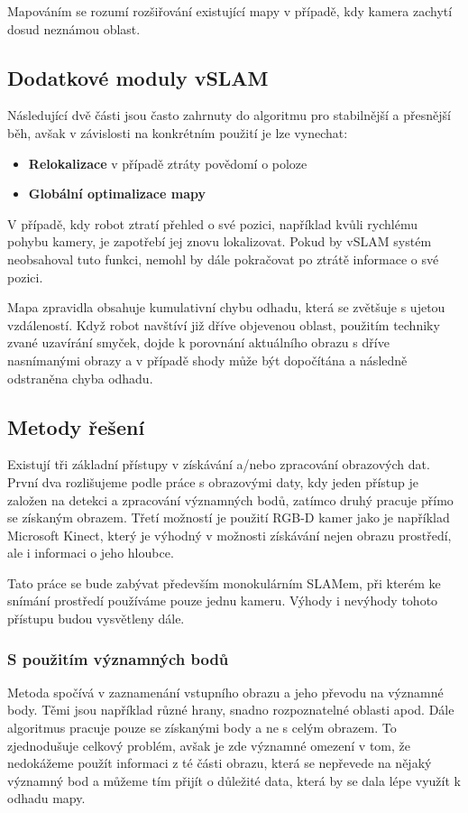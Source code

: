 \documentclass[12pt,a4paper]{article}
\begin{document}
Mapováním se rozumí rozšiřování existující mapy v případě, kdy kamera zachytí dosud neznámou oblast.

\subsection{Dodatkové moduly vSLAM}
Následující dvě části jsou často zahrnuty do algoritmu pro stabilnější a přesnější běh, avšak v závislosti na konkrétním použití je lze vynechat:
\begin{itemize}
\item \textbf{Relokalizace} v případě ztráty povědomí o poloze
\item \textbf{Globální optimalizace mapy}
\end{itemize}

V případě, kdy robot ztratí přehled o své pozici, například kvůli rychlému pohybu kamery, je zapotřebí jej znovu lokalizovat. Pokud by vSLAM systém neobsahoval tuto funkci, nemohl by dále pokračovat po ztrátě informace o své pozici.

Mapa zpravidla obsahuje kumulativní chybu odhadu, která se zvětšuje s ujetou \linebreak vzdáleností. Když robot navštíví již dříve objevenou oblast, použitím techniky zvané uzavírání smyček, dojde k porovnání aktuálního obrazu s dříve nasnímanými obrazy a v případě shody může být dopočítána a následně odstraněna chyba odhadu.

\subsection{Metody řešení}
Existují tři základní přístupy v získávání a/nebo zpracování obrazových dat. První dva rozlišujeme podle práce s obrazovými daty, kdy jeden přístup je založen na detekci a zpracování významných bodů, zatímco druhý pracuje přímo se získaným obrazem. Třetí možností je použití RGB-D kamer jako je například Microsoft Kinect, který je výhodný v možnosti získávání nejen obrazu prostředí, ale i informaci o jeho hloubce. 

Tato práce se bude zabývat především monokulárním SLAMem, při kterém ke snímání prostředí používáme pouze jednu kameru. Výhody i nevýhody tohoto přístupu budou vysvětleny dále.

\subsubsection{S použitím významných bodů}
Metoda spočívá v zaznamenání vstupního obrazu a jeho převodu na významné body. Těmi jsou například různé hrany, snadno rozpoznatelné oblasti apod. Dále algoritmus pracuje pouze se získanými body a ne s celým obrazem. To zjednodušuje celkový problém, avšak je zde významné omezení v tom, že nedokážeme použít informaci z té části obrazu, která se nepřevede na nějaký významný bod a můžeme tím přijít o důležité data, která by se dala lépe využít k odhadu mapy.
\end{document}
